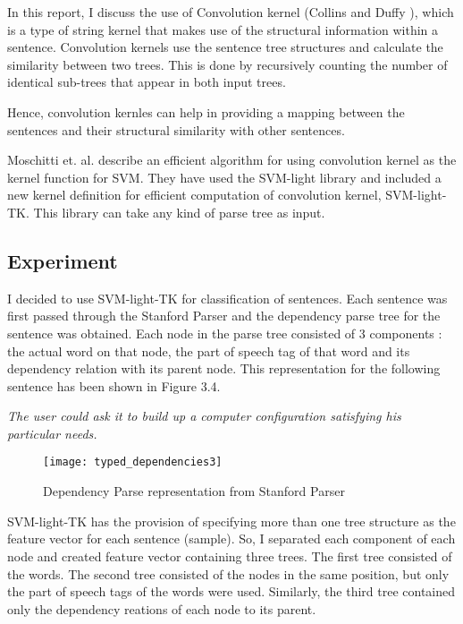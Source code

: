 In this report, I discuss the use of Convolution kernel (Collins and Duffy \cite{Collins01convolutionkernels}), which is a type of string kernel that makes use of the structural information within a sentence.
Convolution kernels use the sentence tree structures and calculate the similarity between two trees.
This is done by recursively counting the number of identical sub-trees that appear in both input trees.

Hence, convolution kernles can help in providing a mapping between the sentences and their structural similarity with other sentences.

Moschitti et. al.\cite{DBLP:conf/emnlp/CroceMB11} describe an efficient algorithm for using convolution kernel as the kernel function for SVM.
They have used the SVM-light library and included a new kernel definition for efficient computation of convolution kernel, SVM-light-TK.
This library can take any kind of parse tree as input.

\subsection{Experiment}
I decided to use SVM-light-TK for classification of sentences.
Each sentence was first passed through the Stanford Parser and the dependency parse tree for the sentence was obtained.
Each node in the parse tree consisted of 3 components : the actual word on that node, the part of speech tag of that word and its dependency relation with its parent node.
This representation for the following sentence has been shown in Figure 3.4.

\emph{The user could ask it to build up a computer configuration satisfying his particular needs.}

\begin{figure}[h]
\centering
\texttt{[image: typed\_dependencies3]} 
\caption{Dependency Parse representation from Stanford Parser}
\label{fig:dep-parse1}
\end{figure}

SVM-light-TK has the provision of specifying more than one tree structure as the feature vector for each sentence (sample).
So, I separated each component of each node and created feature vector containing three trees.
The first tree consisted of the words.
The second tree consisted of the nodes in the same position, but only the part of speech tags of the words were used.
Similarly, the third tree contained only the dependency reations of each node to its parent.

